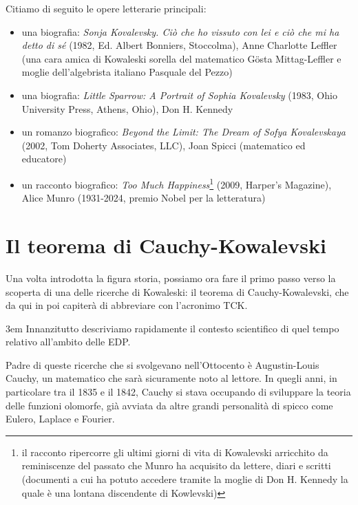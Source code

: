 Citiamo di seguito le opere letterarie principali:
\begin{itemize}

\item una biografia: \textit{Sonja Kovalevsky. Ciò che ho vissuto con lei e ciò che mi ha detto di sé} (1982, Ed. Albert
Bonniers, Stoccolma), Anne Charlotte Leffler (una cara amica di Kowaleski sorella del matematico Gösta Mittag-Leffler e moglie dell'algebrista italiano Pasquale del Pezzo)

\item una biografia: \textit{Little Sparrow: A Portrait of Sophia Kovalevsky} (1983,
Ohio University Press, Athens, Ohio), Don H. Kennedy

\item un romanzo biografico: \textit{Beyond the Limit: The Dream of Sofya Kovalevskaya} (2002, Tom
Doherty Associates, LLC), Joan Spicci (matematico ed educatore)

\item un racconto biografico: \textit{Too Much Happiness}\footnote{ il racconto ripercorre gli ultimi giorni
di vita di Kowalevski arricchito da reminiscenze del passato
che Munro ha acquisito da lettere, diari e scritti (documenti a cui ha potuto
accedere tramite la moglie di Don H. Kennedy la quale è una lontana discendente di Kowlevski)} 
(2009, Harper's Magazine), Alice Munro (1931-2024, premio Nobel per la letteratura)

\end{itemize}

\section{Il teorema di Cauchy-Kowalevski}

Una volta introdotta la figura storia, possiamo ora fare il primo passo verso la scoperta di una delle ricerche di Kowaleski: il teorema di Cauchy-Kowalevski, che da qui in poi capiterà di abbreviare con l'acronimo TCK.

\emergencystretch 3em
Innanzitutto descriviamo rapidamente il contesto scientifico di quel tempo relativo all'ambito delle EDP. 

Padre di queste ricerche che si svolgevano nell'Ottocento è Augustin-Louis Cauchy, un matematico che sarà sicuramente noto al lettore. In quegli anni, in particolare tra il 1835 e il 1842, Cauchy si stava occupando di sviluppare la teoria delle funzioni olomorfe, già avviata da altre grandi personalità di spicco come Eulero, Laplace e Fourier.

